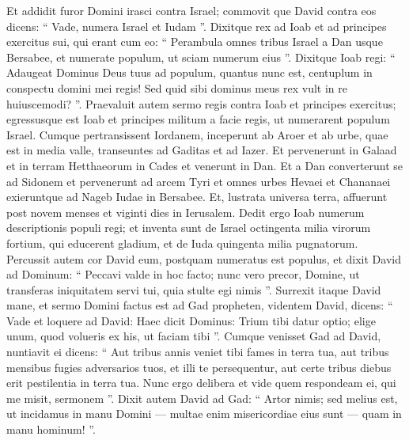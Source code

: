 \begin{biblechapter}
\begin{biblechapter}
\begin{biblechapter}
\begin{biblechapter}
\begin{biblechapter}
\begin{biblechapter}
\begin{biblechapter}
\begin{biblechapter}
\begin{biblechapter}
\begin{biblechapter}
\begin{biblechapter}
\begin{biblechapter}
\begin{biblechapter}
\begin{biblechapter}
\begin{biblechapter}
\begin{biblechapter}
\begin{biblechapter}
\begin{biblechapter}
\begin{biblechapter}
\begin{biblechapter}
\begin{biblechapter}
\begin{biblechapter}
\begin{biblechapter}
\begin{biblechapter}
\verse Et addidit furor Domini irasci contra Israel; commovit que David contra eos dicens: “ Vade, numera Israel et Iudam ”. 
\verse Dixitque rex ad Ioab et ad principes exercitus sui, qui erant cum eo: “ Perambula omnes tribus Israel a Dan usque Bersabee, et numerate populum, ut sciam numerum eius ”. 
\verse Dixitque Ioab regi: “ Adaugeat Dominus Deus tuus ad populum, quantus nunc est, centuplum in conspectu domini mei regis! Sed quid sibi dominus meus rex vult in re huiuscemodi? ”. 
\verse Praevaluit autem sermo regis contra Ioab et principes exercitus; egressusque est Ioab et principes militum a facie regis, ut numerarent populum Israel.
 \verse Cumque pertransissent Iordanem, inceperunt ab Aroer et ab urbe, quae est in media valle, transeuntes ad Gaditas et ad Iazer. 
\verse Et pervenerunt in Galaad et in terram Hetthaeorum in Cades et venerunt in Dan. Et a Dan converterunt se ad Sidonem 
\verse et pervenerunt ad arcem Tyri et omnes urbes Hevaei et Chananaei exieruntque ad Nageb Iudae in Bersabee. 
\verse Et, lustrata universa terra, affuerunt post novem menses et viginti dies in Ierusalem. 
\verse Dedit ergo Ioab numerum descriptionis populi regi; et inventa sunt de Israel octingenta milia virorum fortium, qui educerent gladium, et de Iuda quingenta milia pugnatorum.
 \verse Percussit autem cor David eum, postquam numeratus est populus, et dixit David ad Dominum: “ Peccavi valde in hoc facto; nunc vero precor, Domine, ut transferas iniquitatem servi tui, quia stulte egi nimis ”. 
\verse Surrexit itaque David mane, et sermo Domini factus est ad Gad propheten, videntem David, dicens: 
\verse “ Vade et loquere ad David: Haec dicit Dominus: Trium tibi datur optio; elige unum, quod volueris ex his, ut faciam tibi ”. 
\verse Cumque venisset Gad ad David, nuntiavit ei dicens: “ Aut tribus annis veniet tibi fames in terra tua, aut tribus mensibus fugies adversarios tuos, et illi te persequentur, aut certe tribus diebus erit pestilentia in terra tua. Nunc ergo delibera et vide quem respondeam ei, qui me misit, sermonem ”. 
\verse Dixit autem David ad Gad: “ Artor nimis; sed melius est, ut incidamus in manu Domini — multae enim misericordiae eius sunt — quam in manu hominum! ”.

\end{biblechapter}
\end{biblechapter}
\end{biblechapter}
\end{biblechapter}
\end{biblechapter}
\end{biblechapter}
\end{biblechapter}
\end{biblechapter}
\end{biblechapter}
\end{biblechapter}
\end{biblechapter}
\end{biblechapter}
\end{biblechapter}
\end{biblechapter}
\end{biblechapter}
\end{biblechapter}
\end{biblechapter}
\end{biblechapter}
\end{biblechapter}
\end{biblechapter}
\end{biblechapter}
\end{biblechapter}
\end{biblechapter}
\end{biblechapter}
